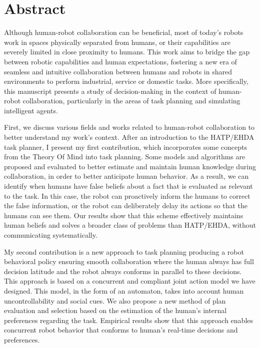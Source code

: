 \chapter*{Abstract}


Although human-robot collaboration can be beneficial, most of today's robots work in spaces physically separated from humans, or their capabilities are severely limited in close proximity to humans. This work aims to bridge the gap between robotic capabilities and human expectations, fostering a new era of seamless and intuitive collaboration between humans and robots in shared environments to perform industrial, service or domestic tasks. More specifically, this manuscript presents a study of decision-making in the context of human-robot collaboration, particularly in the areas of task planning and simulating intelligent agents.

First, we discuss various fields and works related to human-robot collaboration to better understand my work's context. After an introduction to the HATP/EHDA task planner, I present my first contribution, which incorporates some concepts from the Theory Of Mind into task planning. Some models and algorithms are proposed and evaluated to better estimate and maintain human knowledge during collaboration, in order to better anticipate human behavior. As a result, we can identify when humans have false beliefs about a fact that is evaluated as relevant to the task. In this case, the robot can proactively inform the humans to correct the false information, or the robot can deliberately delay its actions so that the humans can see them. Our results show that this scheme effectively maintains human beliefs and solves a broader class of problems than HATP/EHDA, without communicating systematically.

My second contribution is a new approach to task planning producing a robot behavioral policy ensuring smooth collaboration where the human always has full decision latitude and the robot always conforms in parallel to these decisions. This approach is based on a concurrent and compliant joint action model we have designed. This model, in the form of an automaton, takes into account human uncontrollability and social cues. We also propose a new method of plan evaluation and selection based on the estimation of the human's internal preferences regarding the task. Empirical results show that this approach enables concurrent robot behavior that conforms to human's real-time decisions and preferences.

